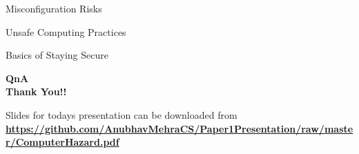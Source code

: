 \documentclass{beamer}
\begin{document}
\begin{frame}{Misconfiguration Risks}
	
\end{frame}
\begin{frame}{Unsafe Computing Practices}
\end{frame}
\begin{frame}{Basics of Staying Secure}
\end{frame}
\begin{frame}
	\begin{center}
	\Large \textbf{QnA \\ Thank You!!}
	\end{center}
	\vspace*{3cm}
	\large Slides for todays presentation can be downloaded from 
	\vspace*{1cm}
	\tiny \textbf{\underline{https://github.com/AnubhavMehraCS/Paper1Presentation/raw/master/ComputerHazard.pdf}}
\end{frame}
\end{document}
